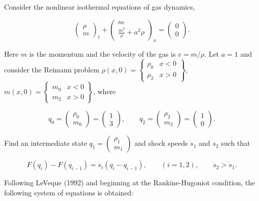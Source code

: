\documentclass[
  11pt,
]{article}
\renewenvironment{quote}%
{%
\definecolor{shadecolor}{rgb}{0.96,0.96,0.96}%
\begin{shaded*}\quoting[leftmargin=0pt, vskip=0pt]
}%
{\endquoting\end{shaded*}}
\begin{document}
\begin{quote}
Consider the nonlinear isothermal equations of gas dynamics,

\[
\begin{pmatrix} \rho \\ m \end{pmatrix}_t +
\begin{pmatrix} m \\ \frac{m^2}\rho + a^2\rho \end{pmatrix}_x =
\begin{pmatrix} 0 \\ 0 \end{pmatrix}.
\]

Here \(m\) is the momentum and the velocity of the gas is \(v=m/\rho\).
Let \(a=1\) and consider the Reimann problem
\(\rho(x,0)=\left\{\begin{array}{cc} \rho_0 & x<0 \\ \rho_2 & x>0 \end{array}\right\}\),
\(m(x,0)=\left\{\begin{array}{cc} m_0 & x<0 \\ m_2 & x>0 \end{array}\right\}\),
where

\[
q_0 = \begin{pmatrix} \rho_0 \\ m_0 \end{pmatrix} = \begin{pmatrix} 1 \\ 3 \end{pmatrix}, \qquad
q_2 = \begin{pmatrix} \rho_2 \\ m_2 \end{pmatrix} = \begin{pmatrix} 1 \\ 0 \end{pmatrix}.
\]

Find an intermediate state
\(q_1=\begin{pmatrix} \rho_1 \\ m_1 \end{pmatrix}\) and shock speeds
\(\dot s_1\) and \(\dot s_2\) such that

\[
F(q_i)-F(q_{i-1}) = \dot s_i(q_i-q_{i-1}), \qquad (i=1,2), \qquad \dot s_2>\dot s_1.
\]
\end{quote}

Following LeVeque (1992) and beginning at the Rankine-Hugoniot
condition, the following system of equations is obtained:
\end{document}

